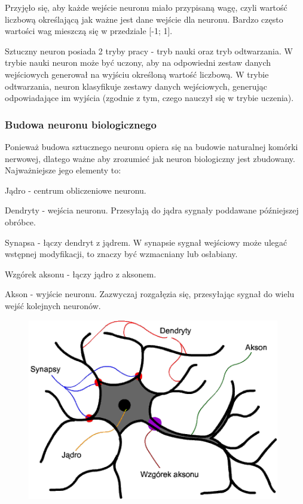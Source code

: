Przyjęło się, aby każde wejście neuronu miało przypisaną wagę, czyli wartość liczbową określającą jak ważne jest dane wejście dla neuronu.
Bardzo często wartości wag mieszczą się w przedziale [-1; 1].

Sztuczny neuron posiada 2 tryby pracy - tryb nauki oraz tryb odtwarzania. \newline
W trybie nauki neuron może być uczony, aby na odpowiedni zestaw danych
wejściowych generował na wyjściu określoną wartość liczbową. \newline
W trybie odtwarzania, neuron klasyfikuje zestawy danych wejściowych, generując
odpowiadające im wyjścia (zgodnie z tym, czego nauczył się w trybie uczenia).

\subsubsection{Budowa neuronu biologicznego}
Ponieważ budowa sztucznego neuronu opiera się na budowie naturalnej komórki nerwowej, dlatego ważne aby zrozumieć jak neuron biologiczny jest zbudowany. \\
Najważniejsze jego elementy to:

\begin{itemize*}
\item Jądro - centrum obliczeniowe neuronu.
\item Dendryty - wejścia neuronu. Przesyłają do jądra sygnały poddawane późniejszej obróbce.
\item Synapsa - łączy dendryt z jądrem. W synapsie sygnał wejściowy może ulegać wstępnej modyfikacji, to znaczy być wzmacniany lub osłabiany.
\item Wzgórek aksonu - łączy jądro z aksonem.
\item Akson - wyjście neuronu. Zazwyczaj rozgałęzia się, przesyłając sygnał do wielu wejść kolejnych neuronów.
\end{itemize*}

\begin{figure}[h]
\begin{center}
\includegraphics[width=11cm]{resources/figures/natural_neuron.png}
\end{center}
\end{figure}

